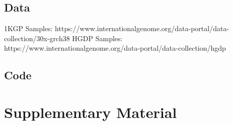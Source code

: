 \documentclass[11pt]{article}
\begin{document}
\subsection{Data}

1KGP Samples: https://www.internationalgenome.org/data-portal/data-collection/30x-grch38
HGDP Samples: https://www.internationalgenome.org/data-portal/data-collection/hgdp


\subsection{Code}






\newpage
\printbibliography[heading=bibintoc]
\newpage















\section*{Supplementary Material} %
\end{document}
